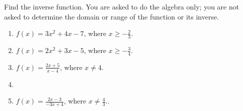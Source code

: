 Find the inverse function. You are asked to do the algebra only; you are not asked to determine the domain or range of the function or its inverse. 
\begin{enumerate}[ref={\fcProblemRef}]
\item $f(x)= 3x^2+4x-7$, where $x\geq -\frac{2}{3}$.

\item $f(x)= 2x^2+3x-5$, where $x\geq -\frac{3}{4}$.

\item $\displaystyle f(x)= \frac{2x+5}{x-4}$, where $x\neq 4$.


\item 
\item  $\displaystyle f(x)= \frac{2x-3}{-3x+4}$, where $x\neq \frac{4}{3}$..

\end{enumerate}
